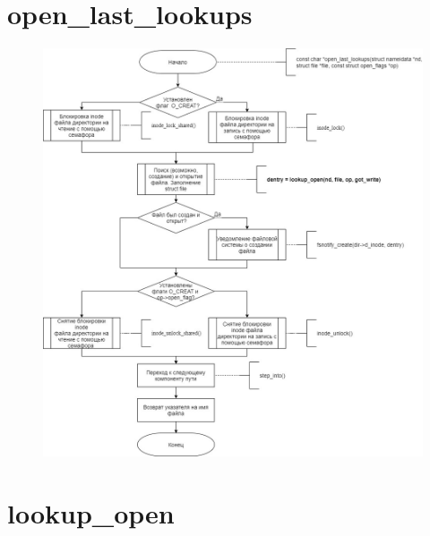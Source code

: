 \documentclass[a4paper,14pt]{extreport}
\begin{document}
\section{open\_last\_lookups}

\begin{figure}[H]
	\centering
	\includegraphics[scale=0.45]{img/open_last_lookups.jpg}
\end{figure}













\section{lookup\_open}
\end{document}
